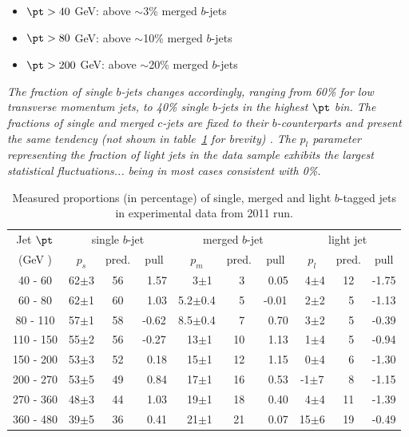 \begin{itemize}
\item
$\pt>40$ GeV: above $\sim$3\% merged $b$-jets
\item
$\pt>80$ GeV: above $\sim$10\% merged $b$-jets
\item
$\pt>200$ GeV: above $\sim$20\% merged $b$-jets
\end{itemize}

\emph{The fraction of single $b$-jets changes accordingly, ranging from 60\% for low transverse momentum jets, to  40\% single $b$-jets in the highest $\pt$ bin.  The fractions of single and merged $c$-jets are fixed to their $b$-counterparts and present the same tendency (not shown in table~\ref{tb:fitfractions} for brevity) . The $p_l$ parameter representing the fraction of light jets in the data sample exhibits the largest statistical fluctuations...}
\emph{being in most cases consistent with 0\%.}





\begin{table}[!hbt] %
\renewcommand{\arraystretch}{1.2}
\centering
\begin{tabular}{ | c || c | c | c || c | c | c || c | c | c ||}
  \hline
  Jet $\pt$ & \multicolumn{3}{c||}{single $b$-jet} & \multicolumn{3}{c||}{merged $b$-jet} & \multicolumn{3}{c||}{~light jet~}\\ \cline{2-10}
    (GeV ) & $p_s$ & pred.& pull & $p_m$ & pred.& pull & $p_l$ & pred.& pull \\ \hline
   40 - 60 &  62$\pm$3 & 56 & ~1.57 &  ~~3$\pm$1   & ~3 & ~0.05 &  ~4$\pm$4  & 12 & -1.75\\ 
   60 - 80 &  62$\pm$1 & 60 & ~1.03 &  5.2$\pm$0.4 & ~5 & -0.01 &  ~2$\pm$2  & ~5 & -1.13\\ 
   80 - 110&  57$\pm$1 & 58 & -0.62 &  8.5$\pm$0.4 & ~7 & ~0.70 &  ~3$\pm$2  & ~5 & -0.39\\ 
  110 - 150&  55$\pm$2 & 56 & -0.27 &  ~13$\pm$1   & 10 & ~1.13 &  ~1$\pm$4  & ~5 & -0.94\\ 
  150 - 200&  53$\pm$3 & 52 & ~0.18 &  ~15$\pm$1   & 12 & ~1.15 &  ~0$\pm$4  & ~6 & -1.30\\ 
  200 - 270&  53$\pm$5 & 49 & ~0.84 &  ~17$\pm$1   & 16 & ~0.53 &  -1$\pm$7  & ~8 & -1.15\\ 
  270 - 360&  48$\pm$3 & 44 & ~1.03 &  ~19$\pm$1   & 18 & ~0.40 &  ~4$\pm$4  & 11 & -1.39\\
  360 - 480&  39$\pm$5 & 36 & ~0.41 &  ~21$\pm$1   & 21 & ~0.07 &  15$\pm$6  & 19 & -0.49\\ \hline
\end{tabular}
\caption{Measured proportions (in percentage) of single, merged and light $b$-tagged jets in experimental data from 2011 run.}
\label{tb:fitfractions}
\end{table}


